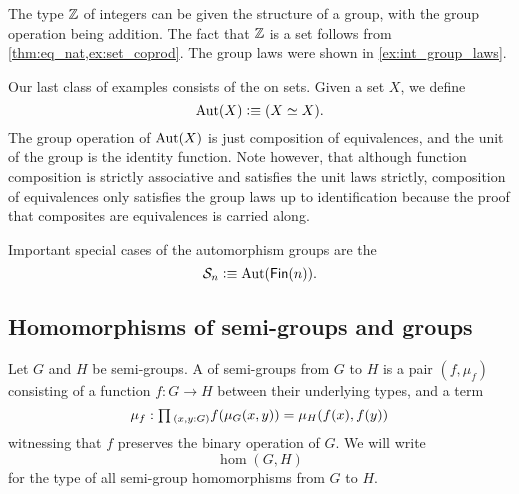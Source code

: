 \begin{eg}
  The type ${\mathbb{Z}}$ of integers can be given the structure of a group, with the group operation being addition. The fact that ${\mathbb{Z}}$ is a set follows from \cref{thm:eq_nat,ex:set_coprod}. The group laws were shown in \cref{ex:int_group_laws}. 
\end{eg}

\begin{eg}
  Our last class of examples consists of the  on sets. Given a set $X$, we define
  \begin{equation*}
    \operatorname{Aut}(X)\vcentcolon\equiv (X\simeq X).
  \end{equation*}
  The group operation of $\operatorname{Aut}(X)$ is just composition of equivalences, and the unit of the group is the identity function. Note however, that although function composition is strictly associative and satisfies the unit laws strictly, composition of equivalences only satisfies the group laws up to identification because the proof that composites are equivalences is carried along.

  Important special cases of the automorphism groups are the 
  \begin{equation*}
    \mathcal{S}_n\vcentcolon\equiv \operatorname{Aut}(\mathsf{Fin}(n)).
  \end{equation*}
\end{eg}

\subsection{Homomorphisms of semi-groups and groups}

\begin{defn}
  Let $G$ and $H$ be semi-groups. A  of semi-groups from $G$ to $H$ is a pair $(f,\mu_f)$ consisting of a function $f:G\to H$ between their underlying types, and a term
  \begin{equation*}
    \mu_f:\prd{x,y:G} f(\mu_G(x,y))=\mu_H(f(x),f(y))
  \end{equation*}
  witnessing that $f$ preserves the binary operation of $G$. We will write
  \begin{equation*}
    \hom(G,H)
  \end{equation*}
  for the type of all semi-group homomorphisms from $G$ to $H$.
\end{defn}

